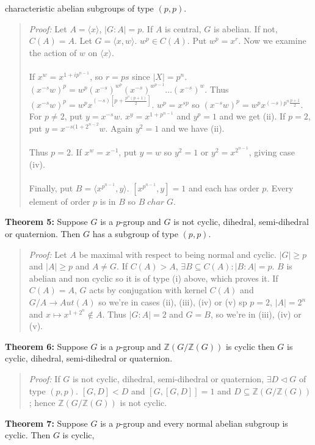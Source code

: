 characteristic abelian subgroups of type $(p,p)$.
\begin{quote}
\emph{Proof:}
Let $A= \langle x \rangle$, $|G:A| = p$.  If $A$ is central, $G$ is abelian.  If not, $C(A)=A$.  Let
$G = \langle x, w \rangle$.  $w^p \in C(A)$. Put $w^p = x^r$.  Now we examine the
action of $w$ on $\langle x \rangle$.\\
\\
If $x^w = x^{1+ip^{n-1}}$, so $r = ps$ since $|X|= p^n$.  $(x^{-s}w)^p = w^p (x^{-s})^{w^p} (x^{-s})^{w^{p-1}}
\ldots (x^{-s})^w$.  Thus $(x^{-s}w)^p = w^p x^{(-s) [p + {\frac {p^n(p+1)} 2}]}$. $w^p = x^{sp}$ so
$(x^{-s}w)^p = w^p x^{(-s) p^n {\frac {p+1} 2}}$. For $p \ne 2$, put $y= x^{-s}w$.  $x^y = x^{1+p^{n-1}}$ and
$y^p =1$ and we get (ii).  If $p=2$, put $y= x^{-s(1+2^{n-2}}w$.  Again $y^2=1$ and we have (ii).
\\
\\
Thus $p=2$.  If $x^w = x^{-1}$, put $y=w$ so $y^2=1$ or $y^2 = x^{2^{n-1}}$, giving case (iv).
\\
\\
Finally, put $B = \langle x^{p^{n-1}}, y \rangle$.  $[x^{p^{n-1}}, y] =1$ and each has order $p$.
Every element of order $p$ is in $B$ so $B \; char \; G$.
\end{quote}
{\bf Theorem 5:} Suppose $G$ is a $p$-group and $G$ is not cyclic, dihedral, semi-dihedral or quaternion.  Then
$G$ has a subgroup of type $(p,p)$.
\begin{quote}
\emph{Proof:}  Let $A$ be maximal with respect to being normal and cyclic. $|G| \geq p$ and $|A| \geq p$
and $A \ne G$.  If $C(A) > A$, $\exists B \subseteq C(A): |B:A| = p$.  $B$ is abelian and non cyclic so it is
of type (i) above, which proves it.  If $C(A)=A$, $G$ acts by conjugation with kernel $C(A)$ and
$G/A \rightarrow Aut(A)$ so we're in cases (ii), (iii), (iv) or (v) sp $p=2$, $|A|=2^n$ and
$x \mapsto x^{1+2^n} \notin A$.   Thus $|G:A|=2$ and $G=B$, so we're in (iii), (iv) or (v).
\end{quote}
{\bf Theorem 6:} Suppose $G$ is a $p$-group and ${\mathbb Z}(G/{\mathbb Z}(G))$ is cyclic then $G$ is cyclic,
dihedral, semi-dihedral or quaternion.
\begin{quote}
\emph{Proof:}
If $G$ is not cyclic,
dihedral, semi-dihedral or quaternion, $\exists D \lhd G$ of type $(p,p)$. $[G,D] < D$ and $[G,[G,D]] = 1$ and
$ D \subseteq {\mathbb Z}(G/{\mathbb Z}(G))$;
hence ${\mathbb Z}(G/{\mathbb Z}(G))$ is not cyclic.
\end{quote}
{\bf Theorem 7:} Suppose $G$ is a $p$-group and every normal abelian subgroup is cyclic.  Then $G$ is cyclic,
